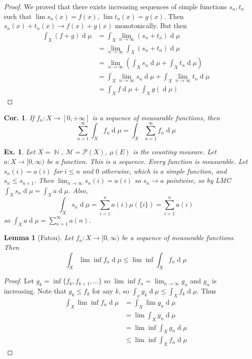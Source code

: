 \documentclass[12pt, a4paper]{book}
\DeclareMathOperator{\N}{\mathbb{N}}
\renewcommand{\d}[1]{\ensuremath{\operatorname{d}\!{#1}}} %
\newtheorem{lemma}[theorem]{Lemma}
\newtheorem{corollary}[theorem]{Cor.}
\newtheorem{example}[theorem]{Ex.}
\theoremstyle{nonumberplain}
\newtheorem{proof}{Proof}
\begin{document}
\begin{proof}
    We proved that there exists increasing sequences of simple functions $s_n,t_n$ such that $\lim s_n(x)=f(x)$, $\lim t_n(x)=g(x)$.
    Then $s_n(x)+t_n(x)\to f(x)+g(x)$ monotonically.
    But then
    \begin{align*}
        \int_X(f+g)\d{\mu} &= \int_X \lim_{n\to\infty}(s_n+t_n)\d{\mu}\\
                           &= \lim_{n\to\infty}\int_X (s_n+t_n)\d{\mu}\\
                           &= \lim_{n\to\infty}\left(\int_X s_n\d{\mu}+\int_X t_n\d{\mu}\right)\\
                           &= \int_X \lim_{n\to\infty}s_n\d{\mu}+\int_X\lim_{n\to\infty} t_n\d{\mu}\\
                           &= \int_X f\d{\mu}+\int_X g(\d{\mu})
    \end{align*}
\end{proof}
\begin{corollary}
    If $f_n:X\to[0,+\infty]$ is a sequence of measurable functions, then
    \[\sum_{n=1}^\infty \int_X f_n\d{\mu}=\int_X\sum\limits_{n=1}^\infty f_n\d{\mu}\]
\end{corollary}
\begin{example}
    Let $X=\N$, $\mathcal{M}=\mathcal{P}(X)$, $\mu(E)$ is the counting measure.
    Let $a:X\to[0,\infty)$ be a function. %
    This is a sequence.
    Every function is measurable.
    Let $s_n(i)=a(i)$ for $i\leq n$ and $0$ otherwise, which is a simple function, and $s_n\leq s_{n+1}$.
    Then $\lim_{n\to\infty}s_n(i)=a(i)$ so $s_n\to a$ pointwise, so by LMC $\int_X s_n\d{\mu}=\int_X a\d{\mu}$.
    Also,
    \[\int_X s_n\d{\mu}=\sum\limits_{i=1}^na(i)\mu(\{i\})=\sum\limits_{i=1}^na(i)\]
    so $\int_X a\d{\mu}=\sum\limits_{n=1}^\infty a(n)$.
\end{example}
\begin{lemma}[Fatou]
    Let $f_n:X\to[0,\infty)$ be a sequence of measurable functions.
    Then
    \[\int_X\lim\inf f_n\d{\mu}\leq\lim\inf\int_X f_n\d{\mu}\]
\end{lemma}
\begin{proof}
    Let $g_k=\inf\{f_k,f_{k+1},\ldots\}$ so $\lim\inf f_n=\lim_{n\to\infty} g_n$ and $g_n$ is increasing.
    Note that $g_k\leq f_k$ for any $k$, so $\int_x g_k\d{\mu}\leq\int_X f_k\d{\mu}$.
    Thus
    \begin{align*}
        \int_X\lim\inf f_n\d{\mu} &= \int_X\lim g_n\d{\mu}\\
                                  &= \lim\int_X g_n\d{\mu}\\
                                  &= \lim\inf \int_X g_n\d{\mu}\\
                                  &\leq \lim\inf\int_X f_n\d{\mu}
    \end{align*}
\end{proof}
\end{document}
